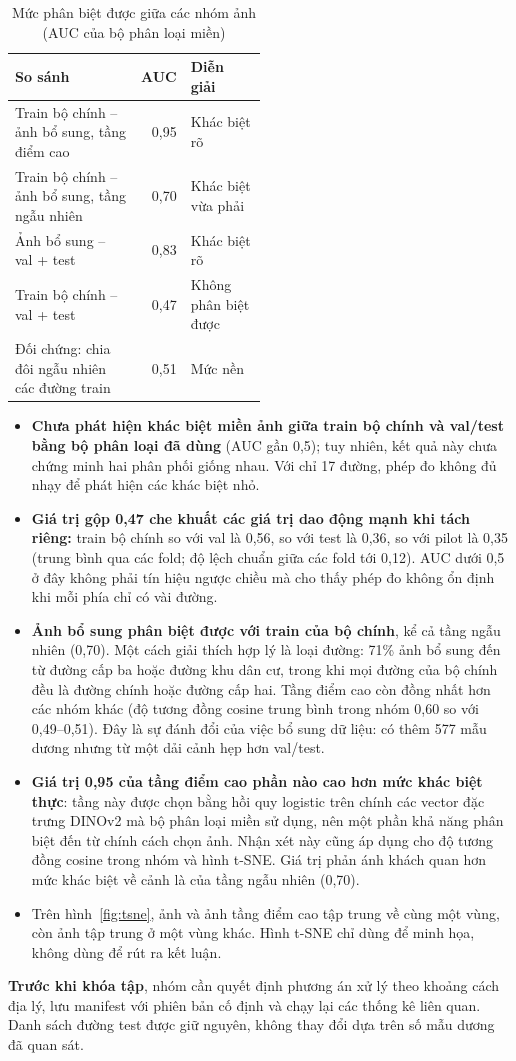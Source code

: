 \begin{table}[H]
\centering
\caption{Mức phân biệt được giữa các nhóm ảnh (AUC của bộ phân loại miền)}
\label{tab:domain}
\begin{tabularx}{\textwidth}{>{\raggedright\arraybackslash}p{0.5\linewidth} R L}
\toprule
\textbf{So sánh} & \textbf{AUC} & \textbf{Diễn giải} \\
\midrule
Train bộ chính -- ảnh bổ sung, tầng điểm cao & 0,95 & Khác biệt rõ \\
Train bộ chính -- ảnh bổ sung, tầng ngẫu nhiên & 0,70 & Khác biệt vừa phải \\
Ảnh bổ sung -- val + test & 0,83 & Khác biệt rõ \\
Train bộ chính -- val + test & 0,47 & Không phân biệt được \\
Đối chứng: chia đôi ngẫu nhiên các đường train & 0,51 & Mức nền \\
\bottomrule
\end{tabularx}
\end{table}

\begin{itemize}
  \item \textbf{Chưa phát hiện khác biệt miền ảnh giữa train bộ chính và val/test bằng bộ phân loại đã dùng} (AUC gần 0,5); tuy nhiên, kết quả này chưa chứng minh hai phân phối giống nhau. Với chỉ 17 đường, phép đo không đủ nhạy để phát hiện các khác biệt nhỏ.
  \item \textbf{Giá trị gộp 0,47 che khuất các giá trị dao động mạnh khi tách riêng:} train bộ chính so với val là 0,56, so với test là 0,36, so với pilot là 0,35 (trung bình qua các fold; độ lệch chuẩn giữa các fold tới 0,12). AUC dưới 0,5 ở đây không phải tín hiệu ngược chiều mà cho thấy phép đo không ổn định khi mỗi phía chỉ có vài đường.
  \item \textbf{Ảnh bổ sung phân biệt được với train của bộ chính}, kể cả tầng ngẫu nhiên (0,70). Một cách giải thích hợp lý là loại đường: 71\% ảnh bổ sung đến từ đường cấp ba hoặc đường khu dân cư, trong khi mọi đường của bộ chính đều là đường chính hoặc đường cấp hai. Tầng điểm cao còn đồng nhất hơn các nhóm khác (độ tương đồng cosine trung bình trong nhóm 0,60 so với 0,49--0,51). Đây là sự đánh đổi của việc bổ sung dữ liệu: có thêm 577 mẫu dương nhưng từ một dải cảnh hẹp hơn val/test.
  \item \textbf{Giá trị 0,95 của tầng điểm cao phần nào cao hơn mức khác biệt thực}: tầng này được chọn bằng hồi quy logistic trên chính các vector đặc trưng DINOv2 mà bộ phân loại miền sử dụng, nên một phần khả năng phân biệt đến từ chính cách chọn ảnh. Nhận xét này cũng áp dụng cho độ tương đồng cosine trong nhóm và hình t-SNE. Giá trị phản ánh khách quan hơn mức khác biệt về cảnh là của tầng ngẫu nhiên (0,70).
  \item Trên hình~\ref{fig:tsne}, ảnh  và ảnh tầng điểm cao tập trung về cùng một vùng, còn ảnh  tập trung ở một vùng khác. Hình t-SNE chỉ dùng để minh họa, không dùng để rút ra kết luận.
\end{itemize}

\textbf{Trước khi khóa tập}, nhóm cần quyết định phương án xử lý theo khoảng cách địa lý, lưu manifest với phiên bản cố định và chạy lại các thống kê liên quan. Danh sách đường test được giữ nguyên, không thay đổi dựa trên số mẫu dương đã quan sát.
